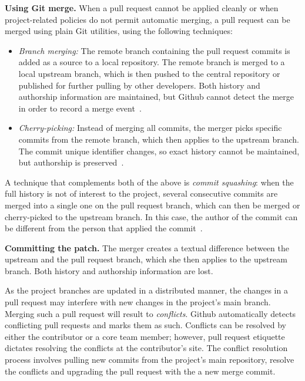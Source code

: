 \documentclass{sig-alternate}
\begin{document}
\textbf{Using Git merge.} When a pull request cannot be applied cleanly or
    when project-related policies do not permit automatic merging, a pull
    request can be merged using plain Git utilities, using the following
    techniques: 

    \begin{itemize}

      \item \emph{Branch merging:} The remote branch containing the pull
        request commits is added as a source to a local repository. The remote 
        branch is merged to a local upstream branch, which is then pushed to
        the central repository or published for further pulling by other
        developers. Both history and authorship information are maintained,
        but Github cannot detect the merge in order to record a merge
        event~\cite[Chapter 3.2]{Chaco09}. 

      \item \emph{Cherry-picking:} Instead of merging all commits, the merger
        picks specific commits from the remote branch, which then applies to the
        upstream branch. The commit unique identifier changes, so exact history
        cannot be maintained, but authorship is 
        preserved~\cite[Chapter 5.3]{Chaco09}.
    
    \end{itemize}

    A technique that complements both of the above is \emph{commit
    squashing}: when the full history is not of interest to the project,
    several consecutive commits are merged into a single one on the pull request
    branch, which can then be merged or cherry-picked to the upstream branch. In
    this case, the author of the commit can be different from the person that
    applied the commit~\cite[Chapter 6.4]{Chaco09}.

\textbf{Committing the patch.} 
  The merger creates a textual difference between the upstream and the pull
  request branch, which she then applies to the upstream branch. Both history and
  authorship information are lost.

As the project branches are updated in a distributed manner, the changes in a
pull request may interfere with new changes in the project's main branch. Merging
such a pull request will result to \emph{conflicts}. Github automatically
detects conflicting pull requests and marks them as such. Conflicts can be
resolved by either the contributor or a core team member; however, pull request
etiquette dictates resolving the conflicts at the contributor's site. The
conflict resolution process involves pulling new commits from the project's main
repository, resolve the conflicts and upgrading the pull request with the a new
merge commit.
\end{document}
